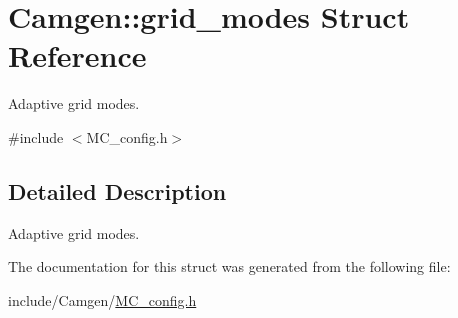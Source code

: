 \hypertarget{a00255}{}\section{Camgen\+:\+:grid\+\_\+modes Struct Reference}
\label{a00255}


Adaptive grid modes.  




{\ttfamily \#include $<$M\+C\+\_\+config.\+h$>$}



\subsection{Detailed Description}
Adaptive grid modes. 

The documentation for this struct was generated from the following file\+:\begin{DoxyCompactItemize}
\item 
include/\+Camgen/\hyperlink{a00690}{M\+C\+\_\+config.\+h}\end{DoxyCompactItemize}
